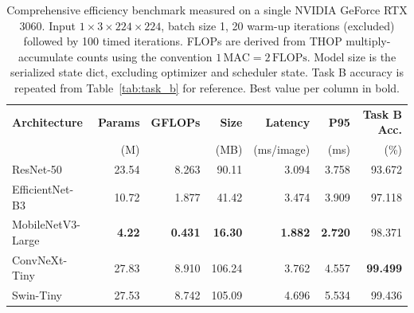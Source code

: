 \begin{table}[t]
\centering
\caption{Comprehensive efficiency benchmark measured on a single
NVIDIA GeForce RTX 3060. Input $1\times3\times224\times224$, batch size 1,
20 warm-up iterations (excluded) followed by 100 timed iterations.
FLOPs are derived from THOP multiply-accumulate counts using the
convention $1\,\text{MAC}=2\,\text{FLOPs}$. Model size is the serialized
state dict, excluding optimizer and scheduler state. Task B accuracy is
repeated from Table~\ref{tab:task_b} for reference. Best value per column
in bold.}
\label{tab:efficiency}
\begin{tabular}{lrrrrrr}
\toprule
\textbf{Architecture} & \textbf{Params} & \textbf{GFLOPs} & \textbf{Size} &
\textbf{Latency} & \textbf{P95} & \textbf{Task B Acc.} \\
 & (M) & & (MB) & (ms/image) & (ms) & (\%) \\
\midrule
ResNet-50          & 23.54 & 8.263 & 90.11  & 3.094 & 3.758 & 93.672 \\
EfficientNet-B3    & 10.72 & 1.877 & 41.42  & 3.474 & 3.909 & 97.118 \\
MobileNetV3-Large  & \textbf{4.22} & \textbf{0.431} & \textbf{16.30} & \textbf{1.882} & \textbf{2.720} & 98.371 \\
ConvNeXt-Tiny      & 27.83 & 8.910 & 106.24 & 3.762 & 4.557 & \textbf{99.499} \\
Swin-Tiny          & 27.53 & 8.742 & 105.09 & 4.696 & 5.534 & 99.436 \\
\bottomrule
\end{tabular}
\end{table}
